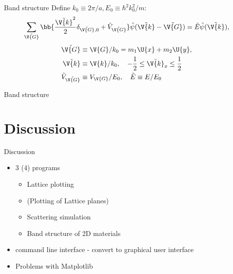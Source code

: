 \documentclass{beamer}
\begin{document}
\begin{frame}{Band structure}
Define $ k_0 \equiv 2\pi/a, E_0 \equiv \hbar^2 k_0^2/m $:
\begin{equation*}
	\sum_{\tilde{\V{G}}} \bb{\frac{\tilde{\V{k}}^2}{2} \delta_{\tilde{\V{G}},0} + \tilde{V}_{\tilde{\V{G}}}} \tilde{\psi}(\tilde{\V{k}} - \tilde{\V{G}}) = \tilde{E} \tilde{\psi}(\tilde{\V{k}}),
\end{equation*}
\begin{align*}
	\tilde{\V{G}} &\equiv \V{G}/k_0 = m_1 \U{x}+m_2 \U{y}, \\
	\tilde{\V{k}} &\equiv \V{k}/k_0, \quad -\frac{1}{2} \leq \tilde{\V{k}}_x \leq \frac{1}{2}\\
	\tilde{V}_{\tilde{\V{G}}} &\equiv V_{\V{G}} / E_0, \quad \tilde{E} \equiv E/E_0
\end{align*}
\end{frame}

\begin{frame}{Band structure}
\end{frame}



\section{Discussion}
\begin{frame}{Discussion}
\begin{itemize}
	\item 3 (4) programs
	\begin{itemize}
		\item Lattice plotting
		\item (Plotting of Lattice planes)
		\item Scattering simulation
		\item Band structure of 2D materials
	\end{itemize}
	\item command line interface - convert to graphical user interface
	\item Problems with Matplotlib
\end{itemize}
\end{frame}
\end{document}
